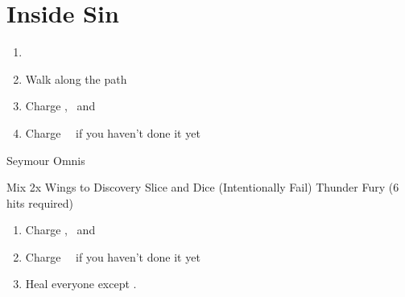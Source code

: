 \chapter{Inside Sin}
\begin{enumerate}
	\item \formation{\tidus}{\lulu}{\rikku}
	\item Walk along the path
	\item Charge \tidus, \lulu\ and \rikku\ \od
	\item Charge \yuna\ \od\ if you haven't done it yet
\end{enumerate}
\begin{battle}[80000]{Seymour Omnis}
	\begin{itemize}
		\rikkuf Mix 2x Wings to Discovery
		\tidusf Slice and Dice (Intentionally Fail)
		\luluf Thunder Fury (6 hits required)
	\end{itemize}
\end{battle}
\begin{enumerate}[resume]
	\item Charge \tidus, \lulu\ and \rikku\ \od
	\item Charge \yuna\ \od\ if you haven't done it yet
	\item Heal everyone except \rikku. %
\end{enumerate}
